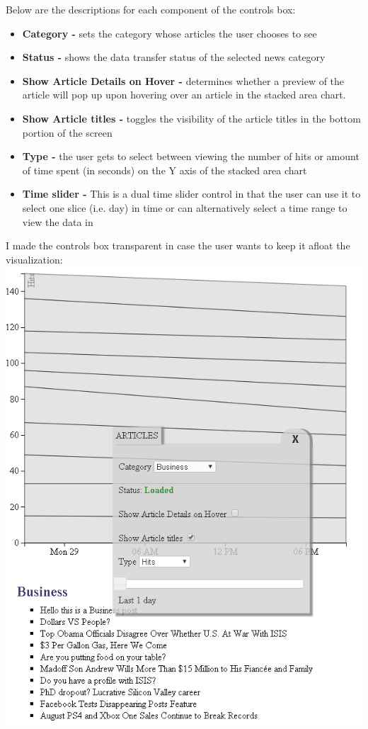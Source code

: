 \documentclass[12pt]{article}
\begin{document}
\newpage

\noindent Below are the descriptions for each component of the controls box:

\begin{itemize}
\item \textbf{Category - } sets the category whose articles the user chooses to see
\item \textbf{Status - } shows the data transfer status of the selected news category
\item \textbf{Show Article Details on Hover - } determines whether a preview of the article will pop up upon hovering over an article in the stacked area chart. 
\item \textbf{Show Article titles - } toggles the visibility of the article titles in the bottom portion of the screen
\item \textbf{Type - } the user gets to select between viewing the number of hits or amount of time spent (in seconds) on the Y axis of the stacked area chart
\item \textbf{Time slider - } This is a dual time slider control in that the user can use it to select one slice (i.e. day) in time or can alternatively select a time range to view the data in 
\end{itemize}

\newpage

\noindent I made the controls box transparent in case the user wants to keep it afloat the visualization: \\

\noindent\includegraphics[scale=0.8]{img/viz_6}
\end{document}
